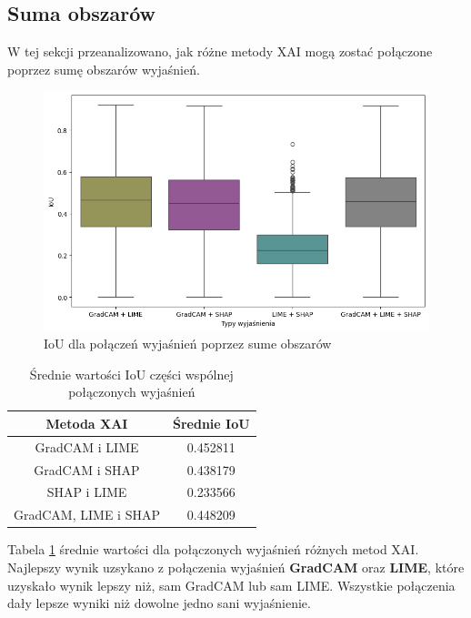 \subsection*{Suma obszarów}
W tej sekcji przeanalizowano, jak różne metody XAI mogą zostać połączone poprzez sumę obszarów wyjaśnień.

\begin{figure}[h]
	\centering\includegraphics[width=.9\textwidth]{img/combine_iou_or}
	\caption{IoU dla połączeń wyjaśnień poprzez sume obszarów}  \label{rys:combine_iou_or}
\end{figure}
\begin{table}[h]
	\centering
	\begin{tabular}{|c|c|}
		\hline
		\textbf{Metoda XAI}  & Średnie IoU \\
		\hline
		GradCAM i LIME       & 0.452811    \\
		\hline
		GradCAM i SHAP       & 0.438179    \\
		\hline
		SHAP i LIME          & 0.233566    \\
		\hline
		GradCAM, LIME i SHAP & 0.448209    \\
		\hline
	\end{tabular}
	\caption{Średnie wartości IoU części wspólnej połączonych wyjaśnień}
	\label{tab:combineandiou}
\end{table}
Tabela \ref{tab:combineandiou} średnie wartości dla połączonych wyjaśnień różnych metod XAI.
Najlepszy wynik uzsykano z połączenia wyjaśnień \textbf{GradCAM} oraz \textbf{LIME}, które uzyskało wynik lepszy niż, sam GradCAM lub sam LIME.
Wszystkie połączenia dały lepsze wyniki niż dowolne jedno sani wyjaśnienie.

\vspace{1cm}

